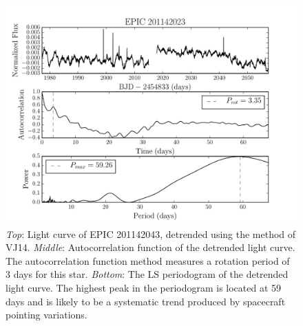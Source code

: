 \documentclass[useAMS, usenatbib, preprint, 12pt]{aastex}
\newcommand{\rpcc}{201142043}
\begin{document}
\begin{figure}
\begin{center}
\includegraphics[width=6in, clip=true]{rotation201142023.pdf}
\caption{{\it Top}: Light curve of EPIC \rpcc, detrended using the method
	of VJ14.
	{\it Middle}: Autocorrelation function of the detrended light curve.
	The autocorrelation function method measures a rotation period of 3
	days for this star.
	{\it Bottom}: The LS periodogram of the detrended light curve.
	The highest peak in the periodogram is located at 59 days and is likely
	to be a systematic trend produced by spacecraft pointing variations.}
\label{fig:rotation_poster_child2}
\end{center}
\end{figure}
\end{document}
